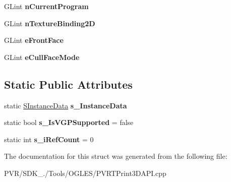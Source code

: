 \begin{DoxyCompactItemize}
\item 
\hypertarget{struct_s_p_v_r_t_print3_d_a_p_i_a56a1034413ef7455181e66a703ec2bac}{G\+Lint {\bfseries n\+Current\+Program}}\label{struct_s_p_v_r_t_print3_d_a_p_i_a56a1034413ef7455181e66a703ec2bac}

\item 
\hypertarget{struct_s_p_v_r_t_print3_d_a_p_i_ad0d4e3998a0a7636bd3403e9062f12c1}{G\+Lint {\bfseries n\+Texture\+Binding2\+D}}\label{struct_s_p_v_r_t_print3_d_a_p_i_ad0d4e3998a0a7636bd3403e9062f12c1}

\item 
\hypertarget{struct_s_p_v_r_t_print3_d_a_p_i_abd009d5fc12389628c4d5151048b2c0e}{G\+Lint {\bfseries e\+Front\+Face}}\label{struct_s_p_v_r_t_print3_d_a_p_i_abd009d5fc12389628c4d5151048b2c0e}

\item 
\hypertarget{struct_s_p_v_r_t_print3_d_a_p_i_af8f0daa3b5688b31d18b996c8e5b6c88}{G\+Lint {\bfseries e\+Cull\+Face\+Mode}}\label{struct_s_p_v_r_t_print3_d_a_p_i_af8f0daa3b5688b31d18b996c8e5b6c88}

\end{DoxyCompactItemize}
\subsection*{Static Public Attributes}
\begin{DoxyCompactItemize}
\item 
\hypertarget{struct_s_p_v_r_t_print3_d_a_p_i_a1e1649388519a9c7fb2be8699f934b9a}{static \hyperlink{struct_s_p_v_r_t_print3_d_a_p_i_1_1_s_instance_data}{S\+Instance\+Data} {\bfseries s\+\_\+\+Instance\+Data}}\label{struct_s_p_v_r_t_print3_d_a_p_i_a1e1649388519a9c7fb2be8699f934b9a}

\item 
\hypertarget{struct_s_p_v_r_t_print3_d_a_p_i_a486562a4785ee52e22b0138ec16586a8}{static bool {\bfseries s\+\_\+\+Is\+V\+G\+P\+Supported} = false}\label{struct_s_p_v_r_t_print3_d_a_p_i_a486562a4785ee52e22b0138ec16586a8}

\item 
\hypertarget{struct_s_p_v_r_t_print3_d_a_p_i_a158479c05ff3524fd3f409c44bb856d7}{static int {\bfseries s\+\_\+i\+Ref\+Count} = 0}\label{struct_s_p_v_r_t_print3_d_a_p_i_a158479c05ff3524fd3f409c44bb856d7}

\end{DoxyCompactItemize}


The documentation for this struct was generated from the following file\+:\begin{DoxyCompactItemize}
\item 
P\+V\+R/\+S\+D\+K\+\_./\+Tools/\+O\+G\+L\+E\+S/P\+V\+R\+T\+Print3\+D\+A\+P\+I.\+cpp\end{DoxyCompactItemize}
